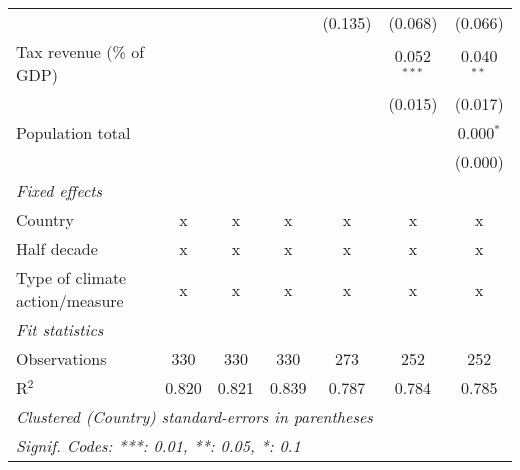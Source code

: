 \begin{tabular}{lcccccc}
                                                                  &         &         &                & (0.135)        & (0.068)        & (0.066)\\   
   Tax revenue (\% of GDP)                                        &         &         &                &                & 0.052$^{***}$  & 0.040$^{**}$\\   
                                                                  &         &         &                &                & (0.015)        & (0.017)\\   
   Population total                                               &         &         &                &                &                & 0.000$^{*}$\\   
                                                                  &         &         &                &                &                & (0.000)\\   
   \emph{Fixed effects}\\
   Country                                                        & x       & x       & x              & x              & x              & x\\  
   Half decade                                                    & x       & x       & x              & x              & x              & x\\  
   Type of climate action/measure                                 & x       & x       & x              & x              & x              & x\\  
   \midrule \emph{Fit statistics}\\
   Observations                                                   & 330     & 330     & 330            & 273            & 252            & 252\\  
   R$^2$                                                          & 0.820   & 0.821   & 0.839          & 0.787          & 0.784          & 0.785\\  
   \midrule
   \multicolumn{7}{l}{\emph{Clustered (Country) standard-errors in parentheses}}\\
   \multicolumn{7}{l}{\emph{Signif. Codes: ***: 0.01, **: 0.05, *: 0.1}}\\
\end{tabular}
\par\endgroup


